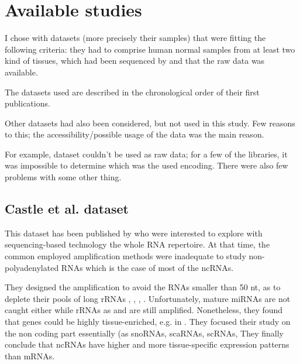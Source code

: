 \section{Available studies}
\label{sec:Trans_AvailableStudies}

I chose with datasets (more precisely their samples) that were fitting the
following criteria: they had to comprise human normal samples from at least
two kind of tissues, which had been sequenced by \Rnaseq and that the raw data was
available.

The datasets used are described in the chronological order of their first publications.

Other datasets had also been considered, but not used in this study. Few reasons to
this; the accessibility/possible usage of the data was the main reason.

For example, \citet{Burge} dataset couldn't be used as raw data; for a few of the
libraries, it was impossible to determine which was the used encoding. There were
also few problems with some other thing.




\subsection{Castle et al. dataset}

This dataset has been published by \citet*{castleData} who were interested to explore
with sequencing-based technology the whole RNA repertoire. At that time, the common
employed amplification methods were inadequate to study non-polyadenylated
\glspl{RNA} which is the case of most of the \glspl{ncRNA}.

They designed the amplification to avoid the \glspl{RNA} smaller than 50 \gls{nt},
as to deplete their pools of long \glspl{rRNA} , , ,
. Unfortunately, mature \glspl{miRNA} are not caught either while
\glspl{rRNA} as  and  are still amplified.
Nonetheless, they found that genes could be highly tissue-enriched, e.g. 
in . They focused their study on the non coding part essentially
(as \glspl{snoRNA}, \glspl{scaRNA}, \glspl{scRNA},
They finally conclude that \glspl{ncRNA} have higher and more tissue-specific
expression patterns than \glspl{mRNA}.


